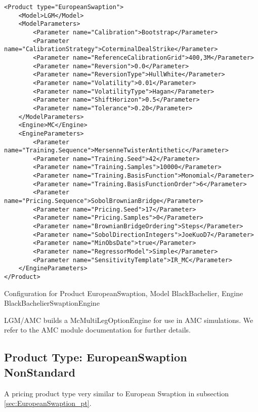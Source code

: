 \begin{longlisting}
\begin{verbatim}
<Product type="EuropeanSwaption">
    <Model>LGM</Model>
    <ModelParameters>
        <Parameter name="Calibration">Bootstrap</Parameter>
        <Parameter name="CalibrationStrategy">CoterminalDealStrike</Parameter>
        <Parameter name="ReferenceCalibrationGrid">400,3M</Parameter>
        <Parameter name="Reversion">0.0</Parameter>
        <Parameter name="ReversionType">HullWhite</Parameter>
        <Parameter name="Volatility">0.01</Parameter>
        <Parameter name="VolatilityType">Hagan</Parameter>
        <Parameter name="ShiftHorizon">0.5</Parameter>
        <Parameter name="Tolerance">0.20</Parameter>
    </ModelParameters>
    <Engine>MC</Engine>
    <EngineParameters>
        <Parameter name="Training.Sequence">MersenneTwisterAntithetic</Parameter>
        <Parameter name="Training.Seed">42</Parameter>
        <Parameter name="Training.Samples">10000</Parameter>
        <Parameter name="Training.BasisFunction">Monomial</Parameter>
        <Parameter name="Training.BasisFunctionOrder">6</Parameter>
        <Parameter name="Pricing.Sequence">SobolBrownianBridge</Parameter>
        <Parameter name="Pricing.Seed">17</Parameter>
        <Parameter name="Pricing.Samples">0</Parameter>
        <Parameter name="BrownianBridgeOrdering">Steps</Parameter>
        <Parameter name="SobolDirectionIntegers">JoeKuoD7</Parameter>
        <Parameter name="MinObsDate">true</Parameter>
        <Parameter name="RegressorModel">Simple</Parameter>
        <Parameter name="SensitivityTemplate">IR_MC</Parameter>
    </EngineParameters>
</Product>
\end{verbatim}
\caption{Configuration for Product EuropeanSwaption, Model BlackBachelier, Engine BlackBachelierSwaptionEngine}
\label{lst:peconfig_EuropeanSwaption_LGM_MC}
\end{longlisting}

LGM/AMC builds a McMultiLegOptionEngine for use in AMC simulations. We refer to the AMC module documentation for further
details.

\subsection{Product Type: EuropeanSwaption NonStandard}

\label{sec:EuropeanSwaption_ns_pt}
A pricing product type very similar to European Swaption in subsection \ref{sec:EuropeanSwaption_pt}.

